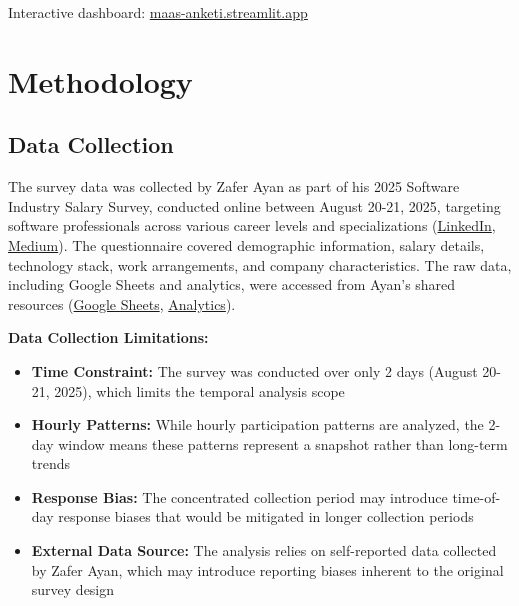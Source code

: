 \documentclass[12pt,a4paper]{article}
\begin{document}
Interactive dashboard: \href{http://maas-anketi.streamlit.app/}{maas-anketi.streamlit.app}

\section{Methodology}

\subsection{Data Collection}
The survey data was collected by Zafer Ayan as part of his 2025 Software Industry Salary Survey, conducted online between August 20-21, 2025, targeting software professionals across various career levels and specializations (\href{https://www.linkedin.com/posts/zaferayan_geleneksel-maa%C5%9F-anketi-buyrun-httpslnkdin-activity-7363866008664629248-7YcQ}{LinkedIn}, \href{https://zaferayan.medium.com/2025-ağustos-detaylı-maaş-anketi-98446d71920a}{Medium}). The questionnaire covered demographic information, salary details, technology stack, work arrangements, and company characteristics. The raw data, including Google Sheets and analytics, were accessed from Ayan's shared resources (\href{https://docs.google.com/spreadsheets/d/1J_MW7t9e2Yi1cErFe5XCnNGaFqXkrdufgZv9Ggnm-RE/edit?usp=sharing}{Google Sheets}, \href{https://docs.google.com/forms/d/16s95bau58GBSfVwOZ8cZm7aX7eqZU_cgA0qKw9WILxI/viewanalytics}{Analytics}).

\textbf{Data Collection Limitations:}
\begin{itemize}
    \item \textbf{Time Constraint:} The survey was conducted over only 2 days (August 20-21, 2025), which limits the temporal analysis scope
    \item \textbf{Hourly Patterns:} While hourly participation patterns are analyzed, the 2-day window means these patterns represent a snapshot rather than long-term trends
    \item \textbf{Response Bias:} The concentrated collection period may introduce time-of-day response biases that would be mitigated in longer collection periods
    \item \textbf{External Data Source:} The analysis relies on self-reported data collected by Zafer Ayan, which may introduce reporting biases inherent to the original survey design
\end{itemize}
\end{document}
